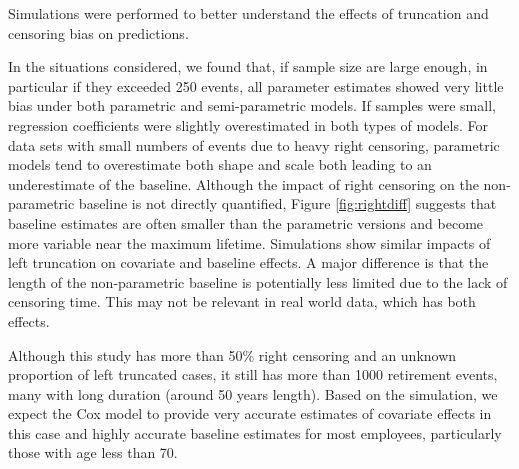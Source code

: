 \documentclass[12pt,letterpaper]{article}
\begin{document}



Simulations were performed to better understand the effects of truncation and censoring bias on predictions.

In the situations considered, we found that, if sample size are large enough, in particular if they exceeded 250 events, all parameter estimates showed very little bias under both parametric and semi-parametric models.  If samples were small, regression coefficients were slightly overestimated in both types of models.  For data sets with small numbers of events due to heavy right censoring, parametric models tend to overestimate both shape and scale both leading to an underestimate of the baseline.  Although the impact of right censoring on the non-parametric baseline is not directly quantified, Figure \ref{fig:rightdiff} suggests that baseline estimates are often smaller than the parametric versions and become more variable near the maximum lifetime.  Simulations show similar impacts of left truncation on covariate and baseline effects.  A major difference is that the length of the non-parametric baseline is potentially less limited due to the lack of censoring time.  This may not be relevant in real world data, which has both effects.

Although this study has more than 50\% right censoring and an unknown proportion of left truncated cases, it still has more than 1000 retirement events, many with long duration (around 50 years length). Based on the simulation, we expect the Cox model to provide very accurate estimates of covariate effects in this case and highly accurate baseline estimates for most employees, particularly those with age less than 70.


\cite{}%
%
\end{document}
